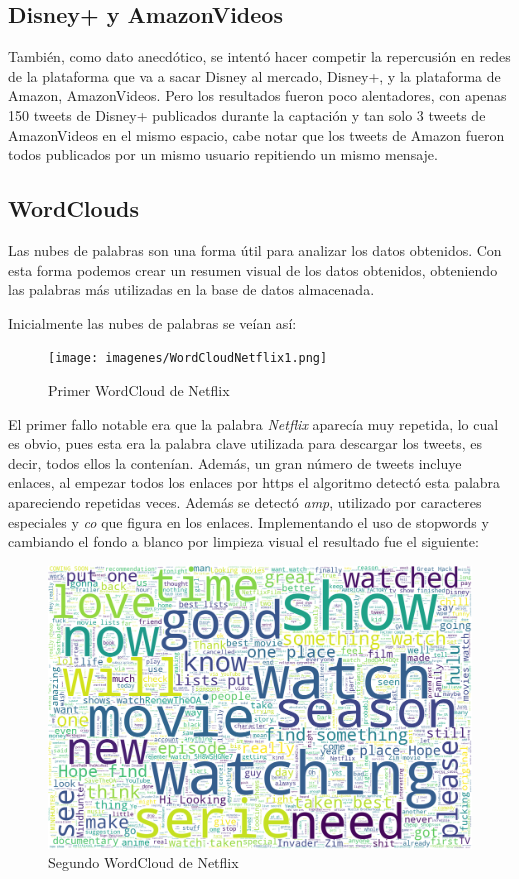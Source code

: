 \subsection{Disney+ y AmazonVideos}

También, como dato anecdótico, se intentó hacer competir la repercusión en redes de la plataforma que va a sacar Disney al mercado, Disney+, y la plataforma de Amazon, AmazonVideos. Pero los resultados fueron poco alentadores, con apenas 150 tweets de Disney+ publicados durante la captación y tan solo 3 tweets de AmazonVideos en el mismo espacio, cabe notar que los tweets de Amazon fueron todos publicados por un mismo usuario repitiendo un mismo mensaje. 



\subsection{WordClouds}
Las nubes de palabras son una forma útil para analizar los datos obtenidos. Con esta forma podemos crear un resumen visual de los datos obtenidos, obteniendo las palabras más utilizadas en la base de datos almacenada. 


Inicialmente las nubes de palabras se veían así: 

\begin{figure}[H]
	\centering
	\texttt{[image: imagenes/WordCloudNetflix1.png]}
	\caption{Primer WordCloud de Netflix}
	\label{fig:wordcloudNetflix1}
\end{figure} 

El primer fallo notable era que la palabra \textit{Netflix} aparecía muy repetida, lo cual es obvio, pues esta era la palabra clave utilizada para descargar los tweets, es decir, todos ellos la contenían. Además, un gran número de tweets incluye enlaces, al empezar todos los enlaces por https el algoritmo detectó esta palabra apareciendo repetidas veces. Además se detectó \textit{amp}, utilizado por caracteres especiales y \textit{co} que figura en los enlaces. Implementando el uso de stopwords y cambiando el fondo a blanco por limpieza visual el resultado fue el siguiente: 

\begin{figure}[H]
	\centering
	\includegraphics[scale=.3]{imagenes/NetflixAll.png}
	\caption{Segundo WordCloud de Netflix}
	\label{fig:wordcloudNetflix2}
\end{figure} 

